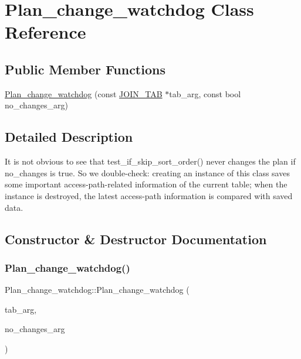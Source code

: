 \hypertarget{classPlan__change__watchdog}{}\section{Plan\+\_\+change\+\_\+watchdog Class Reference}
\label{classPlan__change__watchdog}
\subsection*{Public Member Functions}
\begin{DoxyCompactItemize}
\item 
\mbox{\hyperlink{classPlan__change__watchdog_afcf9d26305e07fb0f3be5864d28bca6d}{Plan\+\_\+change\+\_\+watchdog}} (const \mbox{\hyperlink{classJOIN__TAB}{J\+O\+I\+N\+\_\+\+T\+AB}} $\ast$tab\+\_\+arg, const bool no\+\_\+changes\+\_\+arg)
\end{DoxyCompactItemize}


\subsection{Detailed Description}
It is not obvious to see that test\+\_\+if\+\_\+skip\+\_\+sort\+\_\+order() never changes the plan if no\+\_\+changes is true. So we double-\/check\+: creating an instance of this class saves some important access-\/path-\/related information of the current table; when the instance is destroyed, the latest access-\/path information is compared with saved data. 

\subsection{Constructor \& Destructor Documentation}
\mbox{\label{classPlan__change__watchdog_afcf9d26305e07fb0f3be5864d28bca6d}} 
\subsubsection{\texorpdfstring{Plan\+\_\+change\+\_\+watchdog()}{Plan\_change\_watchdog()}}
{\footnotesize\ttfamily Plan\+\_\+change\+\_\+watchdog\+::\+Plan\+\_\+change\+\_\+watchdog (\begin{DoxyParamCaption}\item[{const \mbox{\hyperlink{classJOIN__TAB}{J\+O\+I\+N\+\_\+\+T\+AB}} $\ast$}]{tab\+\_\+arg,  }\item[{const bool}]{no\+\_\+changes\+\_\+arg }\end{DoxyParamCaption})\hspace{0.3cm}{\ttfamily [inline]}}


